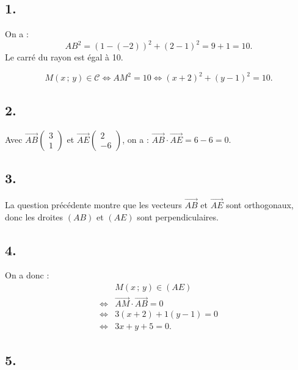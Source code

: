 \subsection*{1.}

On a :
\[
AB^2 = (1 - (-2))^2 + (2 - 1)^2 = 9 + 1 = 10.
\]
Le carré du rayon est égal à 10.

\[
M(x\,;\,y) \in \mathcal{C} \iff AM^2 = 10 \iff (x + 2)^2 + (y - 1)^2 = 10.
\]

\subsection*{2.}

Avec \(\overrightarrow{AB} \begin{pmatrix} 3 \\ 1 \end{pmatrix}\) et \(\overrightarrow{AE} \begin{pmatrix} 2 \\ -6 \end{pmatrix}\), on a :
\(\overrightarrow{AB} \cdot \overrightarrow{AE} = 6 - 6 = 0\).

\subsection*{3.}

La question précédente montre que les vecteurs \(\overrightarrow{AB}\) et \(\overrightarrow{AE}\) sont orthogonaux, donc les droites \((AB)\) et \((AE)\) sont perpendiculaires.

\subsection*{4.}

On a donc :
\begin{align*}
&M(x\,;\,y) \in (AE) \\
\iff &\overrightarrow{AM} \cdot \overrightarrow{AB} = 0 \\
\iff &3(x + 2) + 1(y - 1) = 0 \\
\iff &3x + y + 5 = 0.
\end{align*}

\subsection*{5.}

